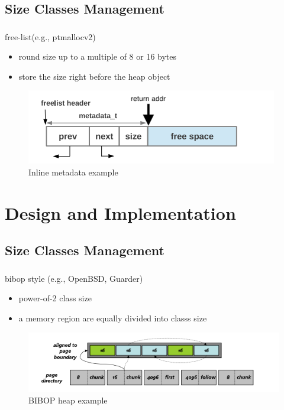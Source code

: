 \documentclass{beamer}
\begin{document}
\subsection{Size Classes Management}
\begin{frame}
	  \frametitle{\secname}
    \framesubtitle{\subsecname}
    free-list(e.g., ptmallocv2)
    \begin{itemize}
        \item round size up to a multiple of 8 or 16 bytes
        \item store the size right before the heap object
    \end{itemize}
    \begin{figure}
      \centering
      \includegraphics[scale=0.6]{inline_metadata}
      \\ Inline metadata example
    \end{figure}
\end{frame}

\section{Design and Implementation}
\subsection{Size Classes Management}
\begin{frame}
  	\frametitle{\secname}
    \framesubtitle{\subsecname}
    bibop style (e.g., OpenBSD, Guarder)
    \begin{itemize}
        \item power-of-2 class size
        \item a memory region are equally divided into classs size
    \end{itemize}
    \begin{figure}
      \centering
      \includegraphics[scale=0.6]{bibop_heap}
      \\ BIBOP heap example
    \end{figure}
\end{frame}
\end{document}
